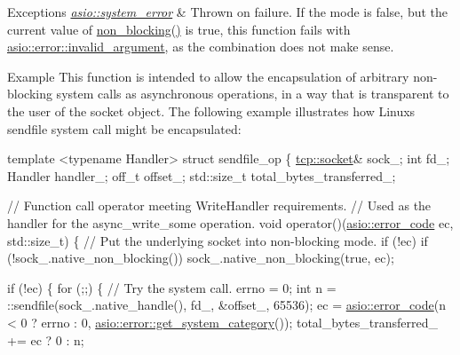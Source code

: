 \begin{DoxyExceptions}{Exceptions}
{\em \hyperlink{classasio_1_1system__error}{asio\+::system\+\_\+error}} & Thrown on failure. If the {\ttfamily mode} is {\ttfamily false}, but the current value of {\ttfamily \hyperlink{classasio_1_1basic__socket_ae8881aa0b691d6be1f71424140cf84e7}{non\+\_\+blocking()}} is {\ttfamily true}, this function fails with \hyperlink{namespaceasio_1_1error_a2a69445eee784059ac2f4a6c4f5fe90da30cedfce8621ca9c21dddce0ac27cd09}{asio\+::error\+::invalid\+\_\+argument}, as the combination does not make sense.\\
\hline
\end{DoxyExceptions}
\begin{DoxyParagraph}{Example}
This function is intended to allow the encapsulation of arbitrary non-\/blocking system calls as asynchronous operations, in a way that is transparent to the user of the socket object. The following example illustrates how Linux\textquotesingle{}s {\ttfamily sendfile} system call might be encapsulated\+: 
\begin{DoxyCode}
 \textcolor{keyword}{template} <\textcolor{keyword}{typename} Handler>
\textcolor{keyword}{struct }sendfile\_op
\{
  \hyperlink{namespacewebsocketpp_1_1transport_1_1asio_1_1socket_1_1error_a828ddaa5ed63a761e1b557465a35f05aa0c31b356014843e1d09514e794a539a7}{tcp::socket}& sock\_;
  \textcolor{keywordtype}{int} fd\_;
  Handler handler\_;
  off\_t offset\_;
  std::size\_t total\_bytes\_transferred\_;

  \textcolor{comment}{// Function call operator meeting WriteHandler requirements.}
  \textcolor{comment}{// Used as the handler for the async\_write\_some operation.}
  \textcolor{keywordtype}{void} operator()(\hyperlink{classasio_1_1error__code}{asio::error\_code} ec, std::size\_t)
  \{
    \textcolor{comment}{// Put the underlying socket into non-blocking mode.}
    \textcolor{keywordflow}{if} (!ec)
      \textcolor{keywordflow}{if} (!sock\_.native\_non\_blocking())
        sock\_.native\_non\_blocking(\textcolor{keyword}{true}, ec);

    \textcolor{keywordflow}{if} (!ec)
    \{
      \textcolor{keywordflow}{for} (;;)
      \{
        \textcolor{comment}{// Try the system call.}
        errno = 0;
        \textcolor{keywordtype}{int} n = ::sendfile(sock\_.native\_handle(), fd\_, &offset\_, 65536);
        ec = \hyperlink{classasio_1_1error__code}{asio::error\_code}(n < 0 ? errno : 0,
            \hyperlink{namespaceasio_1_1error_ab830b9c09076398a1b0e72f619eb0204}{asio::error::get\_system\_category}());
        total\_bytes\_transferred\_ += ec ? 0 : n;


\end{DoxyCode}
\end{DoxyParagraph}
